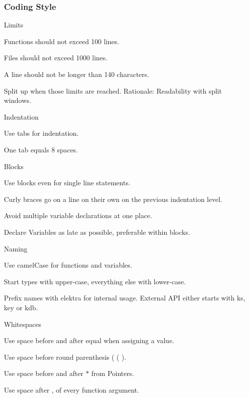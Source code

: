 \subsubsection*{Coding Style}


\begin{DoxyItemize}
\item Limits
\begin{DoxyItemize}
\item Functions should not exceed 100 lines.
\item Files should not exceed 1000 lines.
\item A line should not be longer than 140 characters.
\end{DoxyItemize}

Split up when those limits are reached. Rationale\+: Readability with split windows.
\item Indentation
\begin{DoxyItemize}
\item Use tabs for indentation.
\item One tab equals 8 spaces.
\end{DoxyItemize}
\item Blocks
\begin{DoxyItemize}
\item Use blocks even for single line statements.
\item Curly braces go on a line on their own on the previous indentation level.
\item Avoid multiple variable declarations at one place.
\item Declare Variables as late as possible, preferable within blocks.
\end{DoxyItemize}
\item Naming
\begin{DoxyItemize}
\item Use camel\+Case for functions and variables.
\item Start types with upper-\/case, everything else with lower-\/case.
\item Prefix names with {\ttfamily elektra} for internal usage. External A\+PI either starts with {\ttfamily ks}, {\ttfamily key} or {\ttfamily kdb}.
\end{DoxyItemize}
\item Whitespaces
\begin{DoxyItemize}
\item Use space before and after equal when assigning a value.
\item Use space before round parenthesis ( {\ttfamily (} ).
\item Use space before and after {\ttfamily $\ast$} from Pointers.
\item Use space after {\ttfamily ,} of every function argument.
\end{DoxyItemize}
\end{DoxyItemize}

